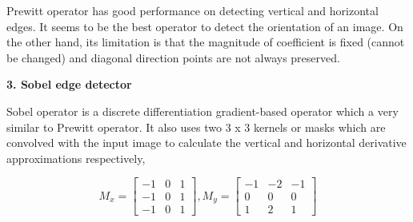 \documentclass[conference]{IEEEtran}
\begin{document}
Prewitt operator has good performance on detecting vertical and horizontal edges. It seems to be the best operator to detect the orientation of an image. On the other hand, its limitation is that the magnitude of coefficient is fixed (cannot be changed) and diagonal direction points are not  always preserved.

\clearpage

\textbf{3. Sobel edge detector}
\newline

Sobel operator is a discrete differentiation gradient-based operator which a very similar to Prewitt operator. It also uses two 3 x 3 kernels or masks which are convolved with the input image to calculate the vertical and horizontal derivative approximations respectively, 

\[ M_x = 
\begin{bmatrix}
-1 & 0 & 1\\
-1 & 0 & 1\\
-1 & 0 & 1
\end{bmatrix}, 
M_y = 
\begin{bmatrix}
-1 & -2 & -1\\
0 & 0 & 0\\
1 & 2 & 1
\end{bmatrix}
\]
\end{document}
